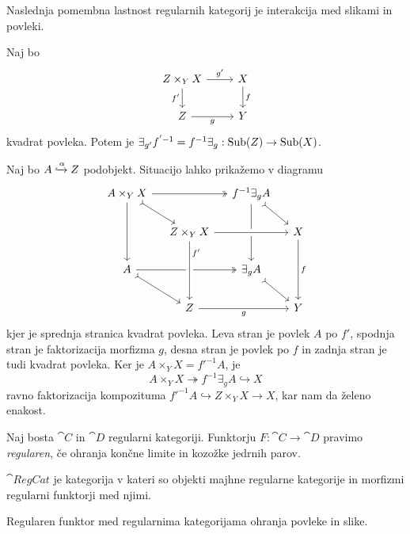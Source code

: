 \documentclass[../kategoricna_logika.tex]{subfiles}
\begin{document}
Naslednja pomembna lastnost regularnih kategorij je interakcija med
slikami in povleki.
\begin{lema}\label{lema:zamenjava-povleka-in-slike}
  Naj bo
  \begin{equation*}
    \begin{tikzcd}
      Z \times_Y X \ar[d, "f'"'] \ar[r, "g'"] & X \ar[d, "f"] \\
      Z \ar[r, "g"'] & Y
    \end{tikzcd}
  \end{equation*}
  kvadrat povleka. Potem je $\exists_{g'}f^{'-1} = f^{-1}\exists_g : \operatorname{Sub}(Z) \to \operatorname{Sub}(X)$.
\end{lema}
\begin{dokaz}
  Naj bo $A \xhookrightarrow{\alpha} Z$ podobjekt.  Situacijo lahko
  prikažemo v diagramu
  \begin{equation*}
    \begin{tikzcd}[column sep=small]
      A \times_Y X \ar[dd] \ar[dr, tail] \ar[rr, two heads] & &
      f^{-1}\exists_g A \ar[dd] \ar[dr, tail] & \\
      & Z \times_Y X  \ar[rr, crossing over] & & X \ar[dd, "f"] \\
      A \ar[dr, tail] \ar[rr, two heads] & & \exists_g A \ar[dr, tail] & \\
      & Z \ar[rr, "g"'] \ar[from=uu, pos=0.2, crossing over, "f'"] & &
      Y
    \end{tikzcd}
  \end{equation*}
  kjer je sprednja stranica kvadrat povleka.  Leva stran je povlek $A$
  po $f'$, spodnja stran je faktorizacija morfizma $g$, desna stran je
  povlek po $f$ in zadnja stran je tudi kvadrat povleka.  Ker je
  $A \times_Y X = f'^{-1}A$, je
  \[A \times_Y X \twoheadrightarrow f^{-1}\exists_g A \hookrightarrow
    X\] ravno faktorizacija kompozituma
  $f'^{-1}A \hookrightarrow Z \times_Y X \to X$, kar nam da želeno
  enakost.
\end{dokaz}
\begin{definicija}
  Naj bosta $\cat{C}$ in $\cat{D}$ regularni kategoriji.  Funktorju
  ${F : \cat{C} \to \cat{D}}$ pravimo \emph{regularen}, če ohranja
  končne limite in kozožke jedrnih parov.
\end{definicija}
\begin{definicija}
  $\cat{RegCat}$ je kategorija v kateri so objekti majhne regularne
  kategorije in morfizmi regularni funktorji med njimi.
\end{definicija}
\begin{lema}
  Regularen funktor med regularnima kategorijama ohranja povleke in
  slike.
\end{lema}
\end{document}
